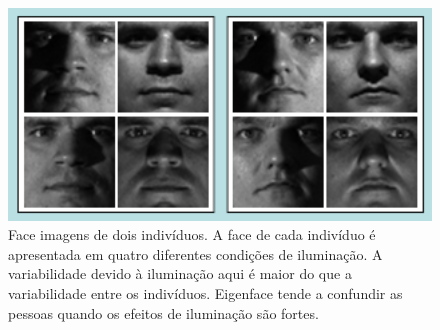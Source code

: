 	\begin{figure}[hbt]
		\begin{center}
			\includegraphics[width=14cm]{figuras/2.FundamentacaoTeorica/exemplosImagensIluminacaoo.png}
		\end{center}
		\caption{Face imagens de dois indivíduos. A face de cada indivíduo é apresentada em quatro diferentes condições de iluminação. A variabilidade devido à iluminação aqui é maior do que a variabilidade entre os indivíduos. Eigenface tende a confundir as pessoas quando os efeitos de iluminação são fortes.}
		\label{exemplosImagensIluminacaoo}
	\end{figure}








